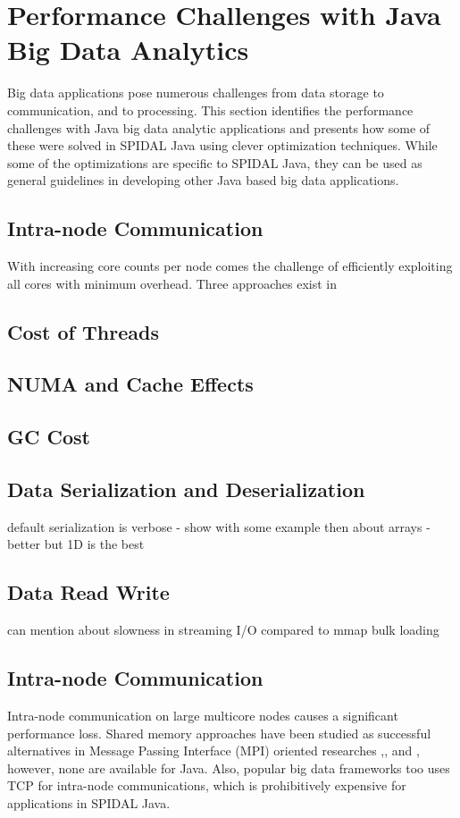 \chapter{Performance Challenges with Java Big Data Analytics} \label{sec:perfchallenges}
Big data applications pose numerous challenges from data storage to communication, and to processing. This section identifies the performance challenges with Java big data analytic applications and presents how some of these were solved in SPIDAL Java using clever optimization techniques. While some of the optimizations are specific to SPIDAL Java, they can be used as general guidelines in developing other Java based big data applications.


\section{Intra-node Communication}
With increasing core counts per node comes the challenge of efficiently exploiting all cores with minimum overhead. Three approaches exist in 
\section{Cost of Threads}
\section{\acl{NUMA} and Cache Effects}

\section{\acl{GC} Cost}

\section{Data Serialization and Deserialization}
default serialization is verbose - show with some example
then about arrays - better but 1D is the best

\section{Data Read Write}
can mention about slowness in streaming I/O compared to mmap bulk loading







\section{Intra-node Communication}
Intra-node communication on large multicore nodes causes a significant performance loss. Shared memory approaches have been studied as successful alternatives in Message Passing Interface (MPI) oriented researches \cite{lechai},\cite{Wickramasinghe:2014:HMC:2612262.2612267}, and \cite{Li:2013:NSC:2493123.2462903}, however, none are available for Java. Also, popular big data frameworks too uses TCP for intra-node communications, which is prohibitively expensive for applications in SPIDAL Java.

